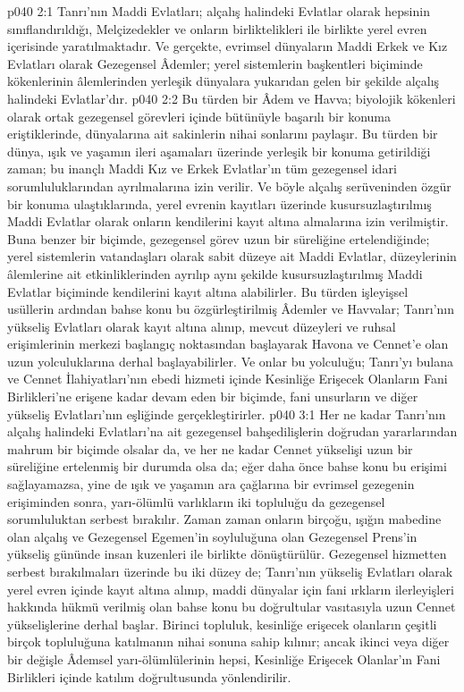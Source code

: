 \vs p040 2:1 Tanrı’nın Maddi Evlatları; alçalış halindeki Evlatlar olarak hepsinin sınıflandırıldığı, Melçizedekler ve onların birliktelikleri ile birlikte yerel evren içerisinde yaratılmaktadır. Ve gerçekte, evrimsel dünyaların Maddi Erkek ve Kız Evlatları olarak Gezegensel Âdemler; yerel sistemlerin başkentleri biçiminde kökenlerinin âlemlerinden yerleşik dünyalara yukarıdan gelen bir şekilde alçalış halindeki Evlatlar’dır.
\vs p040 2:2 Bu türden bir Âdem ve Havva; biyolojik kökenleri olarak ortak gezegensel görevleri içinde bütünüyle başarılı bir konuma eriştiklerinde, dünyalarına ait sakinlerin nihai sonlarını paylaşır. Bu türden bir dünya, ışık ve yaşamın ileri aşamaları üzerinde yerleşik bir konuma getirildiği zaman; bu inançlı Maddi Kız ve Erkek Evlatlar’ın tüm gezegensel idari sorumluluklarından ayrılmalarına izin verilir. Ve böyle alçalış serüveninden özgür bir konuma ulaştıklarında, yerel evrenin kayıtları üzerinde kusursuzlaştırılmış Maddi Evlatlar olarak onların kendilerini kayıt altına almalarına izin verilmiştir. Buna benzer bir biçimde, gezegensel görev uzun bir süreliğine ertelendiğinde; yerel sistemlerin vatandaşları olarak sabit düzeye ait Maddi Evlatlar, düzeylerinin âlemlerine ait etkinliklerinden ayrılıp aynı şekilde kusursuzlaştırılmış Maddi Evlatlar biçiminde kendilerini kayıt altına alabilirler. Bu türden işleyişsel usüllerin ardından bahse konu bu özgürleştirilmiş Âdemler ve Havvalar; Tanrı’nın yükseliş Evlatları olarak kayıt altına alınıp, mevcut düzeyleri ve ruhsal erişimlerinin merkezi başlangıç noktasından başlayarak Havona ve Cennet’e olan uzun yolculuklarına derhal başlayabilirler. Ve onlar bu yolculuğu; Tanrı’yı bulana ve Cennet İlahiyatları’nın ebedi hizmeti içinde Kesinliğe Erişecek Olanların Fani Birlikleri’ne erişene kadar devam eden bir biçimde, fani unsurların ve diğer yükseliş Evlatları’nın eşliğinde gerçekleştirirler.
\vs p040 3:1 Her ne kadar Tanrı’nın alçalış halindeki Evlatları’na ait gezegensel bahşedilişlerin doğrudan yararlarından mahrum bir biçimde olsalar da, ve her ne kadar Cennet yükselişi uzun bir süreliğine ertelenmiş bir durumda olsa da; eğer daha önce bahse konu bu erişimi sağlayamazsa, yine de ışık ve yaşamın ara çağlarına bir evrimsel gezegenin erişiminden sonra, yarı\hyp{}ölümlü varlıkların iki topluluğu da gezegensel sorumluluktan serbest bırakılır. Zaman zaman onların birçoğu, ışığın mabedine olan alçalış ve Gezegensel Egemen’in soyluluğuna olan Gezegensel Prens’in yükseliş gününde insan kuzenleri ile birlikte dönüştürülür. Gezegensel hizmetten serbest bırakılmaları üzerinde bu iki düzey de; Tanrı’nın yükseliş Evlatları olarak yerel evren içinde kayıt altına alınıp, maddi dünyalar için fani ırkların ilerleyişleri hakkında hükmü verilmiş olan bahse konu bu doğrultular vasıtasıyla uzun Cennet yükselişlerine derhal başlar. Birinci topluluk, kesinliğe erişecek olanların çeşitli birçok topluluğuna katılmanın nihai sonuna sahip kılınır; ancak ikinci veya diğer bir değişle Âdemsel yarı\hyp{}ölümlülerinin hepsi, Kesinliğe Erişecek Olanlar’ın Fani Birlikleri içinde katılım doğrultusunda yönlendirilir.

